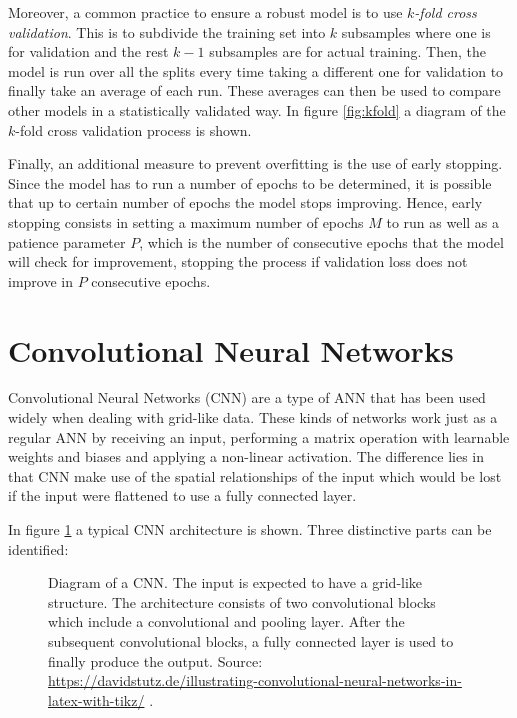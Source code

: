 Moreover, a common practice to ensure a robust model is to use \textit{$k$-fold cross validation}. This is to subdivide the training set into $k$ subsamples where one is for validation and the rest $k-1$ subsamples are for actual training. Then, the model is run over all the splits every time taking a different one for validation to finally take an average of each run. These averages can then be used to compare other models in a statistically validated way. In figure \ref{fig:kfold} a diagram of the $k$-fold cross validation process is shown.

Finally, an additional measure to prevent overfitting is the use of early stopping. Since the model has to run a number of epochs to be determined, it is possible that up to certain number of epochs the model stops improving. Hence, early stopping consists in setting a maximum number of epochs $M$ to run as well as a patience parameter $P$, which is the number of consecutive epochs that the model will check for improvement, stopping the process if validation loss does not improve in $P$ consecutive epochs. 

\section{Convolutional Neural Networks}

Convolutional Neural Networks (CNN) are a type of ANN that has been used widely when dealing with grid-like data. These kinds of networks work just as a regular ANN by receiving an input, performing a matrix operation with learnable weights and biases and applying a non-linear activation. The difference lies in that CNN make use of the spatial relationships of the input which would be lost if the input were flattened to use a fully connected layer.

In figure \ref{fig:cnn} a typical CNN architecture is shown. Three distinctive parts can be identified: 

\begin{figure}[h]
	\centering
	
	\caption[Architecture of a convolutional neural network]{Diagram of a CNN. The input is expected to have a grid-like structure.  The architecture consists of two convolutional blocks which include a convolutional and pooling layer. After the subsequent convolutional blocks, a fully connected layer is used to finally produce the output. Source: \url{https://davidstutz.de/illustrating-convolutional-neural-networks-in-latex-with-tikz/} \cite{conv-graphs}.}
	\label{fig:cnn}
\end{figure}

